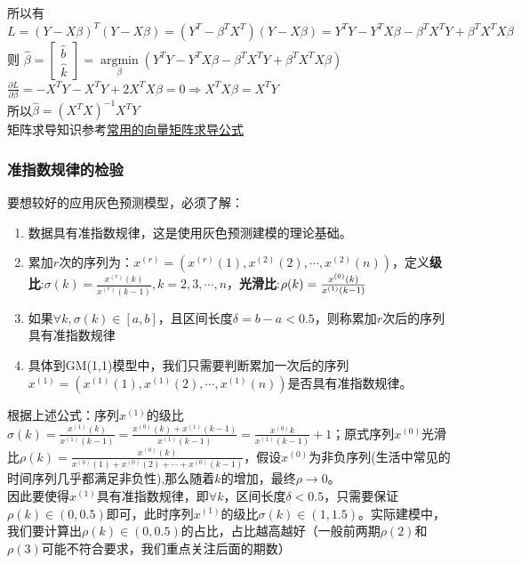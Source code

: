 \documentclass[openany]{progbookcn}
\begin{document}
\indent 所以有$L =(Y-X\beta)^T(Y-X\beta)=(Y^T-\beta^TX^T)(Y-X\beta)=Y^TY-Y^TX\beta-\beta^TX^TY+\beta^TX^TX\beta$\\
\indent 则 ${\hat \beta}=\left[ {\begin{array}{*{20}{c}}
{\hat b}\\
{\hat k}
\end{array}} \right] = \mathop {\arg \min }\limits_\beta  ({Y^T}Y - {Y^T}X\beta  - {\beta ^T}{X^T}Y + {\beta ^T}{X^T}X\beta )$\\
\indent ${\frac{{\partial L}}{{\partial \beta }}} =  - {X^T}Y - {X^T}Y + 2{X^T}X\beta  = 0 \Rightarrow {X^T}X\beta  = {X^T}Y$\\
\indent 所以${\hat \beta}=(X^TX)^{-1}X^TY$ \\
\indent 矩阵求导知识参考\href{https://blog.csdn.net/lipengcn/article/details/52815429}{常用的向量矩阵求导公式} 
\subsubsection{准指数规律的检验}
\indent 要想较好的应用灰色预测模型，必须了解：
\begin{enumerate}[itemindent=2em]
\item 数据具有准指数规律，这是使用灰色预测建模的理论基础。
\item 累加$r$次的序列为：$x^{(r)}=(x^{(r)}(1),x^{(2)}(2),\cdots,x^{(2)}(n))$，定义{\bf 级比}:$\sigma (k) = \frac{{{x^{(r)}}(k)}}{{{x^{(r)}}(k - 1)}},k = 2,3, \cdots ,n$，{\bf 光滑比}:$\rho(k)={{x^{(0)}(k)}\over{x^{(1)}(k-1)}}$
\item 如果$\forall k,\sigma(k)\in[a,b]$，且区间长度$\delta=b-a<0.5$，则称累加$r$次后的序列具有准指数规律
\item 具体到GM(1,1)模型中，我们只需要判断累加一次后的序列$x^{(1)}=(x^{(1)}(1),x^{(1)}(2),\cdots,x^{(1)}(n))$是否具有准指数规律。
\end{enumerate}
\indent \indent 根据上述公式：序列$x^{(1)}$的级比$\sigma (k) = \frac{{{x^{(1)}}(k)}}{{{x^{(1)}}(k - 1)}} = \frac{{{x^{(0)}}(k) + {x^{(1)}}(k - 1)}}{{{x^{(1)}}(k - 1)}} = \frac{{{x^{(0)}}k}}{{{x^{(1)}}(k - 1)}} + 1$；原式序列$x^{(0)}$光滑比$\rho (k) = \frac{{{x^{(0)}}(k)}}{{{x^{(0)}}(1) + {x^{(0)}}(2) + \cdots +{x^{(0)}}(k - 1)}}$，假设$x^{(0)}$为非负序列(生活中常见的时间序列几乎都满足非负性),那么随着$k$的增加，最终$\rho\to 0$。\\
\indent 因此要使得$x^{(1)}$具有准指数规律，即$\forall k$，区间长度$\delta<0.5$，只需要保证$\rho(k)\in (0,0.5)$即可，此时序列$x^{(1)}$的级比$\sigma(k)\in(1,1.5)$。实际建模中，我们要计算出$\rho(k)\in (0,0.5)$的占比，占比越高越好（一般前两期$\rho(2)$和$\rho(3)$可能不符合要求，我们重点关注后面的期数）
\end{document}
